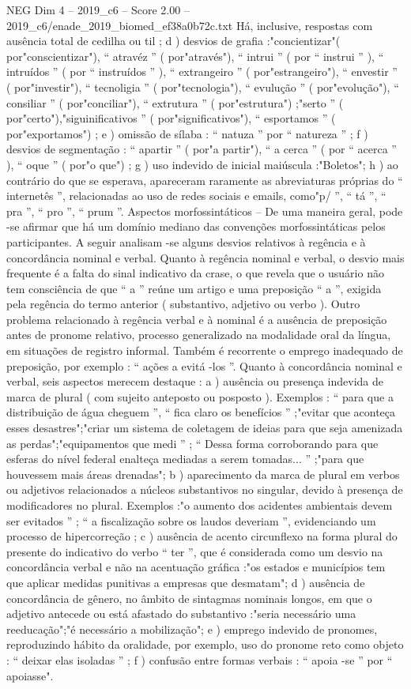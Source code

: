 \begin{textsample}{NEG Dim 4 – 2019\_c6 – Score 2.00 – 2019\_c6/enade\_2019\_biomed\_ef38a0b72c.txt}
Há, inclusive, respostas com ausência total de cedilha ou til ; d ) desvios de grafia :"concientizar"( por"conscientizar"), “ atravéz ” ( por"através"), “ intrui ” ( por “ instrui ” ), “ intruídos ” ( por “ instruídos ” ), “ extrangeiro ” ( por"estrangeiro"), “ envestir ” ( por"investir"), “ tecnoligia ” ( por"tecnologia"), “ evulução ” ( por"evolução"), “ consiliar ” ( por"conciliar"), “ extrutura ” ( por"estrutura") ;"serto ” ( por"certo"),"siguinificativos ” ( por"significativos"), “ esportamos ” ( por"exportamos") ; e ) omissão de sílaba : “ natuza ” por “ natureza ” ; f ) desvios de segmentação : “ apartir ” ( por"a partir"), “ a cerca ” ( por “ acerca ” ), “ oque ” ( por"o que") ; g ) uso indevido de inicial maiúscula :"Boletos"; h ) ao contrário do que se esperava, apareceram raramente as abreviaturas próprias do “ internetês ”, relacionadas ao uso de redes sociais e emails, como"p/ ”, “ tá ”, “ pra ”, “ pro ”, “ prum ”.
Aspectos morfossintáticos – De uma maneira geral, pode -se afirmar que há um domínio mediano das convenções morfossintáticas pelos participantes.
A seguir analisam -se alguns desvios relativos à regência e à concordância nominal e verbal.
Quanto à regência nominal e verbal, o desvio mais frequente é a falta do sinal indicativo da crase, o que revela que o usuário não tem consciência de que “ a ” reúne um artigo e uma preposição “ a ”, exigida pela regência do termo anterior ( substantivo, adjetivo ou verbo ).
Outro problema relacionado à regência verbal e à nominal é a ausência de preposição antes de pronome relativo, processo generalizado na modalidade oral da língua, em situações de registro informal.
Também é recorrente o emprego inadequado de preposição, por exemplo : “ ações a evitá -los ”.
Quanto à concordância nominal e verbal, seis aspectos merecem destaque : a ) ausência ou presença indevida de marca de plural ( com sujeito anteposto ou posposto ).
Exemplos : “ para que a distribuição de água cheguem ”, “ fica claro os benefícios ” ;"evitar que aconteça esses desastres";"criar um sistema de coletagem de ideias para que seja amenizada as perdas";"equipamentos que medi ” ; “ Dessa forma corroborando para que esferas do nível federal enalteça mediadas a serem tomadas... ” ;"para que houvessem mais áreas drenadas"; b ) aparecimento da marca de plural em verbos ou adjetivos relacionados a núcleos substantivos no singular, devido à presença de modificadores no plural.
Exemplos :"o aumento dos acidentes ambientais devem ser evitados ” ; “ a fiscalização sobre os laudos deveriam ”, evidenciando um processo de hipercorreção ; c ) ausência de acento circunflexo na forma plural do presente do indicativo do verbo “ ter ”, que é considerada como um desvio na concordância verbal e não na acentuação gráfica :"os estados e municípios tem que aplicar medidas punitivas a empresas que desmatam"; d ) ausência de concordância de gênero, no âmbito de sintagmas nominais longos, em que o adjetivo antecede ou está afastado do substantivo :"seria necessário uma reeducação";"é necessário a mobilização"; e ) emprego indevido de pronomes, reproduzindo hábito da oralidade, por exemplo, uso do pronome reto como objeto : “ deixar elas isoladas ” ; f ) confusão entre formas verbais : “ apoia -se ” por “ apoiasse".

\end{textsample}
